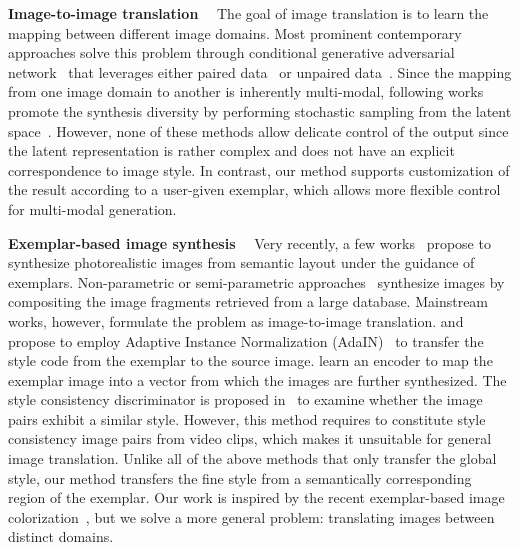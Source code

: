 \documentclass[10pt,twocolumn,letterpaper]{article}
\begin{document}
\noindent\textbf{Image-to-image translation}~~
The goal of image translation is to learn the mapping between different image domains. Most prominent contemporary approaches solve this problem through conditional generative adversarial network~\cite{mirza2014conditional} that leverages either paired data~\cite{isola2017image,wang2018high,park2019semantic} or unpaired data~\cite{zhu2017unpaired,yi2017dualgan,kim2017learning,liu2017unsupervised,royer2017xgan}. Since the mapping from one image domain to another is inherently multi-modal, following works promote the synthesis diversity by performing stochastic sampling from the latent space~\cite{zhu2017toward,huang2018multimodal,lee2018diverse}. However, none of these methods allow delicate control of the output since the latent representation is rather complex and does not have an explicit correspondence to image style. In contrast, our method supports customization of the result according to a user-given exemplar, which allows more flexible control for multi-modal generation.

\noindent\textbf{Exemplar-based image synthesis}~~
Very recently, a few works~\cite{qi2018semi,wang2019example,ma2018exemplar,riviere2019inspirational,bansal2019shapes} propose to synthesize photorealistic images from semantic layout under the guidance of exemplars. Non-parametric or semi-parametric approaches~\cite{qi2018semi,bansal2019shapes} synthesize images by compositing the image fragments retrieved from a large database. 
Mainstream works, however, formulate the  problem as image-to-image translation. \citet{huang2018multimodal} and \citet{ma2018exemplar} propose to employ Adaptive Instance Normalization (AdaIN)~\cite{huang2017arbitrary} to transfer the style code from the exemplar to the source image. \citet{park2019semantic} learn an encoder to map the exemplar image into a vector from which the images are further synthesized. The style consistency discriminator is proposed in~\cite{wang2019example} to examine whether the image pairs exhibit a similar style. However, this method requires to constitute style consistency image pairs from video clips, which makes it unsuitable for general image translation. Unlike all of the above methods that only transfer the global style, our method transfers the fine style from a semantically corresponding region of the exemplar. Our work is inspired by the recent exemplar-based image colorization~\cite{zhang2019deep,he2018deep}, but we solve a more general problem: translating images between distinct domains.
\end{document}
